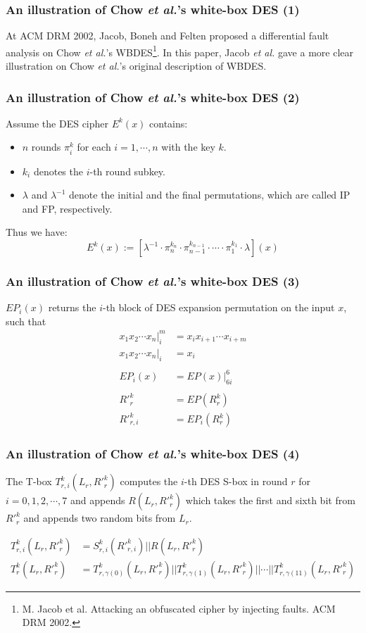 \documentclass{beamer}
\begin{document}
\frame
{
\frametitle{An illustration of Chow \textit{et al.}'s white-box DES (1)}
At ACM DRM 2002, Jacob, Boneh and Felten proposed a differential fault analysis on Chow \textit{et al.}'s WBDES\footnote{\scriptsize{M. Jacob et al. Attacking an obfuscated cipher by injecting faults. ACM DRM 2002.}}. In this paper, Jacob \textit{et al.} gave a more clear illustration on Chow \textit{et al.}'s original description of WBDES.
}

\frame
{
\frametitle{An illustration of Chow \textit{et al.}'s white-box DES (2)}
Assume the DES cipher $E^{k}(x)$ contains:

\begin{itemize}
\item  $n$ rounds $\pi^{k}_{i}$ for each $i = 1, \cdots, n$ with the key $k$. 

\item $k_{i}$ denotes the $i$-th round subkey.

\item $\lambda$ and $\lambda^{-1}$ denote the initial and the final permutations, which are called \textmd{IP} and \textmd{FP}, respectively.
\end{itemize}

Thus we have:
\[E^{k}(x) :=[\lambda^{-1} \cdot \pi^{k_{n}}_{n} \cdot \pi^{k_{n-1}}_{n-1} \cdot \cdots \cdot \pi^{k_{1}}_{1} \cdot \lambda](x)\]
}

\frame
{
\frametitle{An illustration of Chow \textit{et al.}'s white-box DES (3)}
$EP_{i}(x)$ returns the $i$-th block of DES expansion permutation on the input $x$, such that
\begin{align}
x_{1}x_{2}\cdots x_{n}|^{m}_{i} &= x_{i}x_{i+1} \cdots x_{i+m} \\
x_{1}x_{2}\cdots x_{n}|_{i} &= x_{i} \\
\nonumber \\
EP_{i}(x) &= EP(x)|^{6}_{6i}\\
\nonumber \\
R'^{k}_{r} &= EP(R^{k}_{r})\\
R'^{k}_{r,i} &= EP_{i}(R^{k}_{r})
\end{align}
}

\frame
{
\frametitle{An illustration of Chow \textit{et al.}'s white-box DES (4)}
The T-box $T^{k}_{r,i}(L_{r}, R'^{k}_{r})$ computes the $i$-th DES S-box in round $r$ for $i=0,1,2,\cdots,7$ and appends $R(L_{r}, R'^{k}_{r})$ which 
takes the first and sixth bit from $R'^{k}_{r}$ and appends two random bits from $L_{r}$.

\begin{align}
T^{k}_{r,i}(L_{r}, R'^{k}_{r}) &= S^{k}_{r,i}(R'^{k}_{r,i})||R(L_{r}, R'^{k}_{r})\\
T^{k}_{r}(L_{r}, R'^{k}_{r}) &= T^{k}_{r,\gamma(0)}(L_{r}, R'^{k}_{r})||T^{k}_{r,\gamma(1)}(L_{r}, R'^{k}_{r})||\cdots||T^{k}_{r,\gamma(11)}(L_{r}, R'^{k}_{r})
\end{align}
}
\end{document}
